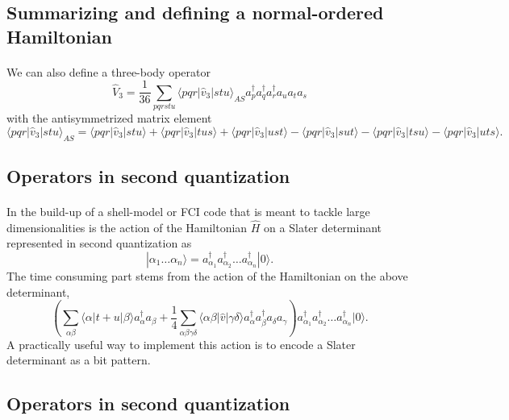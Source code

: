 \documentclass[%
twoside,                 %
final,                   %
10pt]{article}
\begin{document}
\subsection*{Summarizing and defining a normal-ordered Hamiltonian}

\paragraph{}
We can also define a three-body operator
\[
\hat{V}_3 = \frac{1}{36} \sum_{pqrstu} \langle pqr|\hat{v}_3|stu\rangle_{AS} 
                a_p^\dagger a_q^\dagger a_r^\dagger a_u a_t a_s
\]
with the antisymmetrized matrix element
\[
            \langle pqr|\hat{v}_3|stu\rangle_{AS} = \langle pqr|\hat{v}_3|stu\rangle + \langle pqr|\hat{v}_3|tus\rangle + \langle pqr|\hat{v}_3|ust\rangle- \langle pqr|\hat{v}_3|sut\rangle - \langle pqr|\hat{v}_3|tsu\rangle - \langle pqr|\hat{v}_3|uts\rangle.
\]





\subsection*{Operators in second quantization}

\paragraph{}
In the build-up of a shell-model or FCI code that is meant to tackle large dimensionalities
is the action of the Hamiltonian $\hat{H}$ on a
Slater determinant represented in second quantization as
\[
 |\alpha_1\dots \alpha_n\rangle = a_{\alpha_1}^{\dagger} a_{\alpha_2}^{\dagger} \dots a_{\alpha_n}^{\dagger} |0\rangle.
\]
The time consuming part stems from the action of the Hamiltonian
on the above determinant,
\[
\left(\sum_{\alpha\beta} \langle \alpha|t+u|\beta\rangle a_\alpha^{\dagger} a_\beta + \frac{1}{4} \sum_{\alpha\beta\gamma\delta}
                \langle \alpha \beta|\hat{v}|\gamma \delta\rangle a_\alpha^{\dagger} a_\beta^{\dagger} a_\delta a_\gamma\right)a_{\alpha_1}^{\dagger} a_{\alpha_2}^{\dagger} \dots a_{\alpha_n}^{\dagger} |0\rangle.
\]
A practically useful way to implement this action is to encode a Slater determinant as a bit pattern.




\subsection*{Operators in second quantization}
\end{document}
